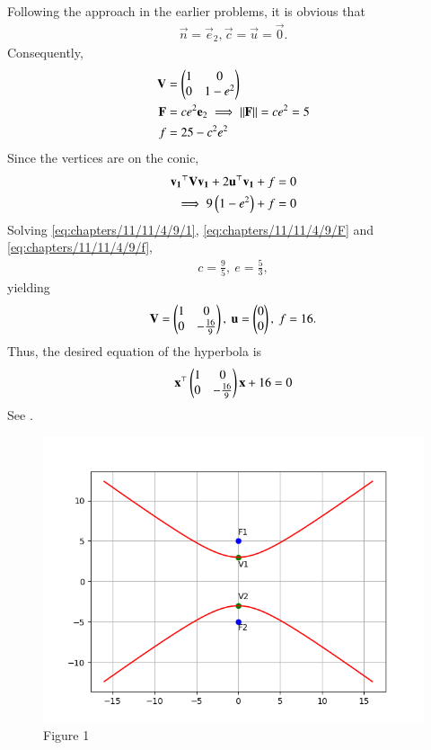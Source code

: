 Following the approach in the earlier problems, it is obvious that
	\begin{align}
		\vec{n} 
			= \vec{e}_2,
	\vec{c} =\vec{u}=\vec{0}.
\end{align}
Consequently,
%
\begin{align}
	\mathbf{V} &= \begin{pmatrix}1 &0\\ 0 & 1-e^2\end{pmatrix}
	\\
	\mathbf{F} &= ce^2\mathbf{e}_2 \implies \left\lVert\mathbf{F}\right\rVert = ce^2=5
\label{eq:chapters/11/11/4/9/F}
	\\
	f 
	  &= 25 - c^2 e^2
\label{eq:chapters/11/11/4/9/f}
\end{align}
%
Since the vertices are  on the conic,
\begin{align}
	\mathbf{v_1}^{\top}\mathbf{V}\mathbf{v_1} +2\mathbf{u}^{\top}\mathbf{v_1}+f &= 0\\
\implies 9\left(1-e^2\right) + f &= 0\\
 \label{eq:chapters/11/11/4/9/1}
\end{align}
Solving \eqref{eq:chapters/11/11/4/9/1},
\eqref{eq:chapters/11/11/4/9/F}
and
\eqref{eq:chapters/11/11/4/9/f},
\begin{align}
	c = \frac{9}{5},\ 
	e = \frac{5}{3},
\end{align}
%
yielding
\begin{align}
	\mathbf{V} = \begin{pmatrix}1&0\\0& -\frac{16}{9}\end{pmatrix} ,\
	\mathbf{u} = \begin{pmatrix}0\\0\end{pmatrix},\
	f = 16.
\end{align}
%
Thus, the desired equation of the hyperbola is
\begin{align}
	\mathbf{x}^{\top} \begin{pmatrix}1&0\\ 0 & -\frac{16}{9}\end{pmatrix} \mathbf{x} +16 =0
\end{align}
%
See
%
    .
\begin{figure}[h!]
  \centering
    \includegraphics[width=\columnwidth]{chapters/11/11/4/9/figs/Figure_1.png}
    \caption{Figure 1}
    \label{fig:chapters/11/11/4/9/}
\end{figure}
%



